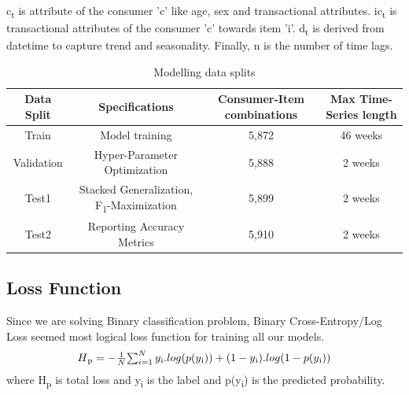 c\textsubscript{t} is attribute of the consumer 'c' like age, sex and transactional attributes. 
ic\textsubscript{t} is transactional attributes of the consumer 'c'  towards item 'i'. 
d\textsubscript{t} is derived from datetime to capture trend and seasonality. 
Finally, n is the number of time lags.
\begin{table}[t]
\caption{Modelling data splits}
\vspace{0.1 in}
\centering
\resizebox{3.3in}{!}
{%
\begin{tabular}{|c|c|c|c|}
\hline
{\bf Data Split} & {\bf Specifications} & {\bf Consumer-Item combinations} & {\bf Max Time-Series length} \\  
\hline\hline
Train  		&  Model training &  5,872 &  46 weeks \\ \hline
Validation	  		&  Hyper-Parameter Optimization &  5,888 &  2 weeks \\ \hline
Test1  		&  Stacked Generalization, F\textsubscript{1}-Maximization & 5,899 &  2 weeks\\ \hline
Test2	  		&  Reporting Accuracy Metrics & 5,910 &  2 weeks\\
\hline
\end{tabular}
}
\label{tab:mlmodels}
\end{table}
\subsection{Loss Function}
Since we are solving Binary classification problem, Binary Cross-Entropy/Log Loss seemed most logical loss function 
for training all our models.
  \begin{equation}
      \begin{array}{l}
        H\textsubscript{p} = - \frac{1}{N}$$\sum_{i=1}^{N}y\textsubscript{i}.log(p(y\textsubscript{i}))+
        (1- y\textsubscript{i}).log(1-p(y\textsubscript{i}))
      \end{array}
    \label{eqn:logloss}
  \end{equation}
where H\textsubscript{p} is total loss and y\textsubscript{i} is the label and p(y\textsubscript{i}) is the predicted probability.
